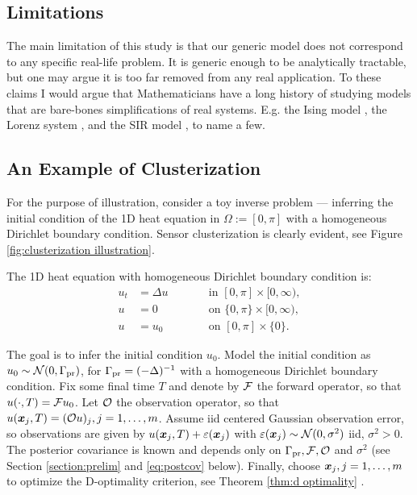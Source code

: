 
\subsection{Limitations}\label{subsec:limitations}
The main limitation of this study is that our generic model does not
correspond to any specific real-life problem. It is generic enough to
be analytically tractable, but one may argue it is too far removed
from any real application. To these claims I would argue that
Mathematicians have a long history of studying models that are
bare-bones simplifications of real systems. E.g. the Ising model
\cite{cipra1987}, the Lorenz system \cite{brin}, and the SIR model
\cite{keeling2008}, to name a few.



\subsection{An Example of Clusterization}\label{subsec:example}
For the purpose of illustration, consider a toy inverse problem ---
inferring the initial condition of the 1D heat equation in $\Omega :=
[0,\pi]$ with a homogeneous Dirichlet boundary condition. Sensor
clusterization is clearly evident, see Figure \ref{fig:clusterization
  illustration}.

The 1D heat equation with homogeneous Dirichlet boundary condition is:
\begin{subequations}\label{eq:heat equation}
  \begin{alignat}{2}
    u_t &= \Delta u &&\qquad \text{in } [0,\pi] \times [0,\infty),\\
      u &= 0 &&\qquad \text{on } \{0, \pi\} \times [0,\infty),\\
        u &= u_0 &&\qquad \text{on }[0,\pi] \times \{0\}.
  \end{alignat}
\end{subequations}


The goal is to infer the initial condition $u_0$. Model the initial
condition as $u_0 \sim \mathcal{N}(0,\Gamma_{\textup{pr}})$, for $\Gamma_{\textup{pr}} =
(-\Delta)^{-1}$ with a homogeneous Dirichlet boundary condition. Fix
some final time $T$ and denote by $\mathcal{F}$ the forward operator, so that
$u(\cdot, T) = \mathcal{F} u_0$. Let $\mathcal{O}$ the observation operator, so that
$u({\boldsymbol{x}}_j,T) = (\mathcal{O} u)_j, j=1,\dots,m$. Assume iid centered Gaussian
observation error, so observations are given by $u({\boldsymbol{x}}_j,T) +
\varepsilon({\boldsymbol{x}}_j)$ with $\varepsilon({\boldsymbol{x}}_j) \sim \mathcal{N}(0, \sigma^2)$ iid, $\sigma^2
> 0$. The posterior covariance is known and depends only on $\Gamma_{\textup{pr}},
\mathcal{F}, \mathcal{O}$ and $\sigma^2$ \cite{Stuart10} (see Section
\ref{section:prelim} and \eqref{eq:postcov} below). Finally, choose
${\boldsymbol{x}}_j,j=1,\dots,m$ to optimize the D-optimality criterion, see Theorem
\ref{thm:d optimality} \cite{AlexanderianGloorGhattas14}.

